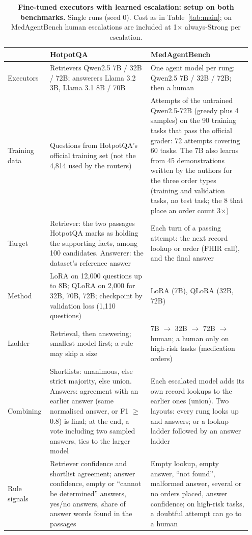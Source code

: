 \documentclass{article}
\newif\ifshowupdates \showupdatestrue
\begin{document}
\begin{table}[!htb]
\ifshowupdates\color{andycolor}\fi
\caption{\textbf{Fine-tuned executors with learned escalation: setup on both benchmarks.} Single runs (seed 0). Cost as in Table~\ref{tab:main}; on MedAgentBench human escalations are included at 1$\times$ always-Strong per escalation.}
\label{tab:ftexec}
\centering\scriptsize
\begin{tabular}{@{}p{0.15\linewidth}p{0.40\linewidth}p{0.40\linewidth}@{}}
\toprule
 & \textbf{HotpotQA} & \textbf{MedAgentBench} \\
\midrule
Executors & Retrievers Qwen2.5 7B / 32B / 72B; answerers Llama 3.2 3B, Llama 3.1 8B / 70B & One agent model per rung: Qwen2.5 7B / 32B / 72B; then a human \\
Training data & Questions from HotpotQA's official training set (not the 4,814 used by the routers) & Attempts of the untrained Qwen2.5-72B (greedy plus 4 samples) on the 90 training tasks that pass the official grader: 72 attempts covering 60 tasks. The 7B also learns from 45 demonstrations written by the authors for the three order types (training and validation tasks, no test task; the 8 that place an order count 3$\times$) \\
Target & Retriever: the two passages HotpotQA marks as holding the supporting facts, among 100 candidates. Answerer: the dataset's reference answer & Each turn of a passing attempt: the next record lookup or order (FHIR call), and the final answer \\
Method & LoRA on 12,000 questions up to 8B; QLoRA on 2,000 for 32B, 70B, 72B; checkpoint by validation loss (1,110 questions) & LoRA (7B), QLoRA (32B, 72B) \\
Ladder & Retrieval, then answering; smallest model first; a rule may skip a size & 7B $\to$ 32B $\to$ 72B $\to$ human; a human only on high-risk tasks (medication orders) \\
Combining & Shortlists: unanimous, else strict majority, else union. Answers: agreement with an earlier answer (same normalised answer, or F1 $\ge$ 0.8) is final; at the end, a vote including two sampled answers, ties to the larger model & Each escalated model adds its own record lookups to the earlier ones (union). Two layouts: every rung looks up and answers; or a lookup ladder followed by an answer ladder \\
Rule signals & Retriever confidence and shortlist agreement; answer confidence, empty or ``cannot be determined'' answers, yes/no answers, share of answer words found in the passages & Empty lookup, empty answer, ``not found'', malformed answer, several or no orders placed, answer confidence; on high-risk tasks, a doubtful attempt can go to a human \\

\end{tabular}
\end{table}
\end{document}
